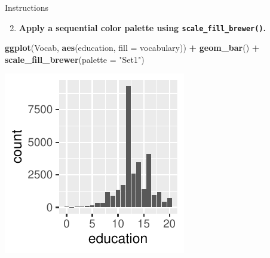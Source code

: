 \documentclass[
  ignorenonframetext,
]{beamer}
\newenvironment{Shaded}{\begin{snugshade}}{\end{snugshade}}
\newcommand{\AttributeTok}[1]{\textcolor[rgb]{0.13,0.29,0.53}{#1}}
\newcommand{\FunctionTok}[1]{\textcolor[rgb]{0.13,0.29,0.53}{\textbf{#1}}}
\newcommand{\NormalTok}[1]{#1}
\newcommand{\SpecialCharTok}[1]{\textcolor[rgb]{0.81,0.36,0.00}{\textbf{#1}}}
\newcommand{\StringTok}[1]{\textcolor[rgb]{0.31,0.60,0.02}{#1}}
\providecommand{\tightlist}{%
  \setlength{\itemsep}{0pt}\setlength{\parskip}{0pt}}
\begin{document}
\begin{frame}[fragile]{Instructions}
\label{instructions-9}
\begin{enumerate}
\setcounter{enumi}{1}
\tightlist
\item
  \textbf{Apply a sequential color palette using
  \texttt{scale\_fill\_brewer()}.}
\end{enumerate}

\begin{Shaded}
\begin{Highlighting}[]
\FunctionTok{ggplot}\NormalTok{(Vocab, }\FunctionTok{aes}\NormalTok{(education, }\AttributeTok{fill =}\NormalTok{ vocabulary)) }\SpecialCharTok{+} \FunctionTok{geom\_bar}\NormalTok{() }\SpecialCharTok{+}
    \FunctionTok{scale\_fill\_brewer}\NormalTok{(}\AttributeTok{palette =} \StringTok{"Set1"}\NormalTok{)}
\end{Highlighting}
\end{Shaded}

\begin{center}\includegraphics[width=0.5\linewidth]{Figs/unnamed-chunk-53-1} \end{center}
\end{frame}
\end{document}
